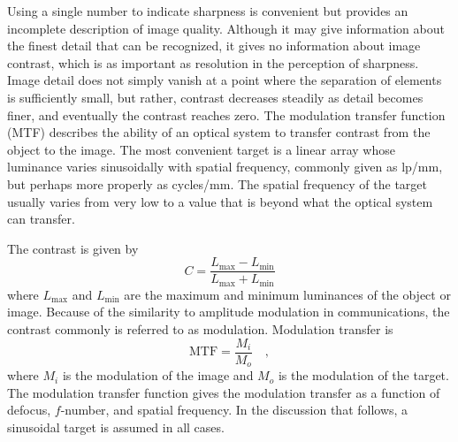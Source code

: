 \documentclass[11pt, oneside]{scrartcl}   	%
\begin{document}
Using a single number to indicate sharpness is convenient but provides an incomplete description of image quality. Although it may give information about the finest detail that can be recognized, it gives no information about image contrast, which is as important as resolution in the perception of sharpness. Image detail does not simply vanish at a point where the separation of elements is sufficiently small, but rather, contrast decreases steadily as detail becomes finer, and eventually the contrast reaches zero. The modulation transfer function (MTF) describes the ability of an optical system to transfer contrast from the object to the image. The most convenient target is a linear array whose luminance varies sinusoidally with spatial frequency, commonly given as lp/mm, but perhaps more properly as cycles/mm. The spatial frequency of the target usually varies from very low to a value that is beyond what the optical system can transfer.

The contrast is given by
\begin{equation}
C = \frac{L_\mathrm{max} - L_\mathrm{min}}{L_\mathrm{max} + L_\mathrm{min}}
\end{equation}
where $L_\mathrm{max}$ and $ L_\mathrm{min}$ are the maximum and minimum luminances of the object or image. Because of the similarity to amplitude modulation in communications, the contrast commonly is referred to as modulation. Modulation transfer is
\begin{equation}
\mathrm{MTF} = \frac{M_i}{M_o}\quad,
\end{equation}
where $M_i$ is the modulation of the image and $M_o$ is the modulation of the target. The modulation transfer function gives the modulation transfer as a function of defocus, $f$-number, and spatial frequency. In the discussion that follows, a sinusoidal target is assumed in all cases.
\end{document}
